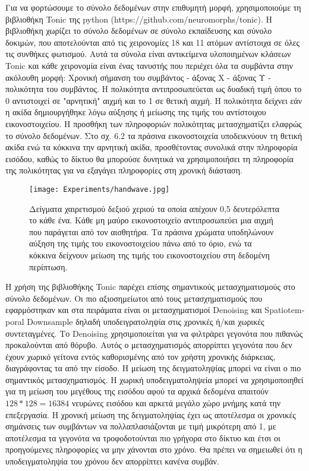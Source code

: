 \documentclass[12pt]{report}
\begin{document}
Για να φορτώσουμε το σύνολο δεδομένων στην επιθυμητή μορφή, χρησιμοποιούμε τη βιβλιοθήκη \textlatin{Tonic} της \textlatin{python (https://github.com/neuromorphs/tonic)}. Η βιβλιοθήκη χωρίζει το σύνολο δεδομένων σε σύνολο εκπαίδευσης και σύνολο δοκιμών, που αποτελούνται από τις χειρονομίες 18 και 11 ατόμων αντίστοιχα σε όλες τις συνθήκες φωτισμού. Αυτά τα σύνολα είναι αντικείμενα υλοποιημένων κλάσεων \textlatin{Tonic} και κάθε χειρονομία είναι ένας τανυστής που περιέχει όλα τα συμβάντα στην ακόλουθη μορφή: Χρονική σήμανση του συμβάντος - άξονας Χ - άξονας Υ - πολικότητα του συμβάντος. Η πολικότητα αντιπροσωπεύεται ως δυαδική τιμή όπου το 0 αντιστοιχεί σε "αρνητική" αιχμή και το 1 σε θετική αιχμή. Η πολικότητα δείχνει εάν η ακίδα δημιουργήθηκε λόγω αύξησης ή μείωσης της τιμής του αντίστοιχου εικονοστοιχείου. Η προσθήκη των πληροφοριών πολικότητας μετασχηματίζει ελαφρώς το σύνολο δεδομένων. Στο σχ. 6.2 τα πράσινα εικονοστοιχεία υποδεικνύουν τη θετική ακίδα ενώ τα κόκκινα την αρνητική ακίδα, προσθέτοντας συνολικά στην πληροφορία εισόδου, καθώς το δίκτυο θα μπορούσε δυνητικά να χρησιμοποιήσει τη πληροφορία της πολικότητας για να εξαγάγει πληροφορίες στη χρονική διάσταση.

\begin{figure}[htp] %
    \centering
     \texttt{[image: Experiments/handwave.jpg]}
    \caption{Δείγματα χαιρετισμού δεξιού χεριού τα οποία απέχουν 0,5 δευτερόλεπτα το κάθε ένα. Κάθε μη μαύρο εικονοστοιχείο αντιπροσωπεύει μια αιχμή που παράγεται από τον αισθητήρα. Τα πράσινα χρώματα υποδηλώνουν αύξηση της τιμής του εικονοστοιχείου πάνω από το όριο, ενώ τα κόκκινα δείχνουν μείωση της τιμής του εικονοστοιχείου στη δεδομένη περίπτωση.}
    \label{fig:representation-methods}
\end{figure}

Η χρήση της βιβλιοθήκης \textlatin{Tonic} παρέχει επίσης σημαντικούς μετασχηματισμούς στο σύνολο δεδομένων. Οι πιο αξιοσημείωτοι από τους μετασχηματισμούς που εφαρμόστηκαν και στα πειράματα είναι οι μετασχηματισμοί \textlatin{Denoising} και \textlatin{Spatiotemporal Downsample} δηλαδή υποδειγρατοληψία στις χρονικές ή/και χωρικές συντεταγμένες. Το \textlatin{Denoising} χρησιμοποιείται για να φιλτράρει γεγονότα που πιθανώς προκαλούνται από θόρυβο. Αυτός ο μετασχηματισμός απορρίπτει γεγονότα που δεν έχουν χωρικό γείτονα εντός καθορισμένης από τον χρήστη χρονικής διάρκειας, διαγράφοντας τα από την είσοδο. Η μείωση της δειγματοληψίας μπορεί να είναι ο πιο σημαντικός μετασχηματισμός. Η χωρική υποδειγματοληψεία μπορεί να χρησιμοποιηθεί για τη μείωση του μεγέθους της εισόδου αφού τα αρχικά δεδομένα απαιτούν \(128*128 = 16384\) νευρώνες εισόδου και αρκετά μεγάλο χώρο μνήμης κατά την επεξεργασία. Η χρονική μείωση της δειγματοληψίας έχει ως αποτέλεσμα οι χρονικές σημάνσεις των συμβάντων να πολλαπλασιάζονται με τιμή μικρότερη από 1, με αποτέλεσμα τα γεγονότα να τροφοδοτούνται πιο γρήγορα στο δίκτυο και έτσι οι προηγούμενες πληροφορίες να μην χάνονται στο χρόνο. Θα πρέπει να σημειωθεί ότι η υποδειγματοληψία του χρόνου δεν απορρίπτει κανένα συμβάν.
\end{document}
